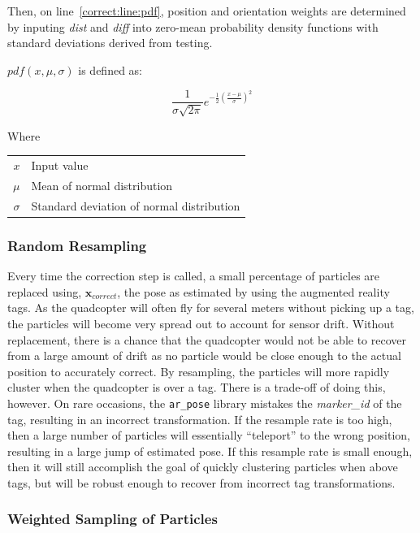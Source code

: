 			Then, on line~\ref{correct:line:pdf}, position and orientation weights are determined by inputing \textit{dist} and \textit{diff} into zero-mean probability density functions with standard deviations derived from testing.

			$pdf(x, \mu, \sigma)$ is defined as:

			\[ \frac{1}{\sigma\sqrt{2\pi}}e^{-\frac{1}{2}(\frac{x-\mu}{\sigma})^2} \]
			
			Where

			\begin{table}[H]
				\centering
			\begin{tabular}{@{}r@{$\quad$\,}l}
				$x$ & Input value\\
				$\mu$ & Mean of normal distribution\\
				$\sigma$ & Standard deviation of normal distribution
			\end{tabular}
			\end{table}

		 
		\subsubsection{Random Resampling}

			Every time the correction step is called, a small percentage of particles are replaced using, $\textbf{x}_{correct}$, the pose as estimated by using the augmented reality tags. As the quadcopter will often fly for several meters without picking up a tag, the particles will become very spread out to account for sensor drift. Without replacement, there is a chance that the quadcopter would not be able to recover from a large amount of drift as no particle would be close enough to the actual position to accurately correct. By resampling, the particles will more rapidly cluster when the quadcopter is over a tag. There is a trade-off of doing this, however. On rare occasions, the \texttt{ar\_pose} library mistakes the \textit{marker\_id} of the tag, resulting in an incorrect transformation. If the resample rate is too high, then a large number of particles will essentially ``teleport'' to the wrong position, resulting in a large jump of estimated pose. If this resample rate is small enough, then it will still accomplish the goal of quickly clustering particles when above tags, but will be robust enough to recover from incorrect tag transformations.


		\subsubsection{Weighted Sampling of Particles}

